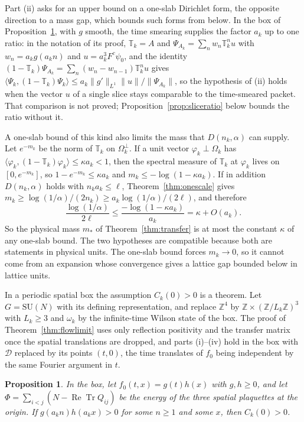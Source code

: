 \documentclass[aps,prd,twocolumn,superscriptaddress,nofootinbib,longbibliography,floatfix,amsmath,amssymb,10pt]{revtex4-2}
\newtheorem{proposition}[theorem]{Proposition}
\theoremstyle{definition}
\theoremstyle{remark}
\newcommand{\Z}{\mathbb{Z}}
\newcommand{\SU}{\mathrm{SU}}
\newcommand{\ReTr}{\operatorname{Re}\operatorname{Tr}}
\newcommand{\ip}[2]{\langle #1,#2\rangle}
\begin{document}
Part (ii) asks for an upper bound on a one-slab Dirichlet form, the opposite
direction to a mass gap, which bounds such forms from below. In the box of
Proposition~\ref{prop:flowpositive}, with $g$ smooth, the time smearing
supplies the factor $a_k$ up to one ratio: in the notation of its proof,
$\mathbb T_k=A$ and $\Psi_{A_k}=\sum_nw_n\mathbb T_k^nu$ with
$w_n=a_kg(a_kn)$ and $u=a_k^3F^c\psi_0$, and the identity $(1-\mathbb T_k)
\Psi_{A_k}=\sum_n(w_n-w_{n-1})\mathbb T_k^nu$ gives
$\ip{\Psi_k}{(1-\mathbb T_k)\Psi_k}\le a_k\|g'\|_{L^1}\|u\|/\|\Psi_{A_k}\|$, so
the hypothesis of (ii) holds when the vector $u$ of a single slice stays
comparable to the time-smeared packet. That comparison is not proved;
Proposition~\ref{prop:sliceratio} below bounds the ratio without it.

A one-slab bound of this kind also limits the mass that $D(n_k,\alpha)$
can supply. Let $e^{-m_k}$ be the norm of $\mathbb T_k$ on $\Omega_k^\perp$.
If a unit vector $\varphi_k\perp\Omega_k$ has $\ip{\varphi_k}{(1-\mathbb
T_k)\varphi_k}\le\kappa a_k<1$, then the spectral measure of $\mathbb T_k$
at $\varphi_k$ lives on $[0,e^{-m_k}]$, so $1-e^{-m_k}\le\kappa a_k$ and
$m_k\le-\log(1-\kappa a_k)$. If in addition $D(n_k,\alpha)$ holds with
$n_ka_k\le\ell$, Theorem~\ref{thm:onescale} gives $m_k\ge\log(1/\alpha)
/(2n_k)\ge a_k\log(1/\alpha)/(2\ell)$, and therefore
\[
\frac{\log(1/\alpha)}{2\ell}\le\frac{-\log(1-\kappa a_k)}{a_k}=\kappa+
O(a_k).
\]
So the physical mass $m_*$ of Theorem~\ref{thm:transfer} is at most the
constant $\kappa$ of any one-slab bound. The two hypotheses are compatible
because both are statements in physical units. The one-slab bound forces
$m_k\to0$, so it cannot come from an expansion whose convergence gives a
lattice gap bounded below in lattice units.


In a periodic spatial box the assumption $C_k(0)>0$ is a theorem. Let
$G=\SU(N)$ with its defining representation, and replace $\Z^4$ by
$\Z\times(\Z/L_k\Z)^3$ with $L_k\ge3$ and $\omega_k$ by the infinite-time
Wilson state of the box. The proof of Theorem~\ref{thm:flowlimit} uses only
reflection positivity and the transfer matrix once the spatial translations
are dropped, and parts (i)--(iv) hold in the box with $\mathcal D$ replaced by
its points $(t,0)$, the time translates of $f_0$ being independent by the
same Fourier argument in $t$.

\begin{proposition}\label{prop:flowpositive}
In the box, let $f_0(t,x)=g(t)h(x)$ with $g,h\ge0$, and let $\Phi=\sum_{i<j}
(N-\ReTr Q_{ij})$ be the energy of the three spatial plaquettes at the origin.
If $g(a_kn)h(a_kx)>0$ for some $n\ge1$ and some $x$, then $C_k(0)>0$.
\end{proposition}
\end{document}
